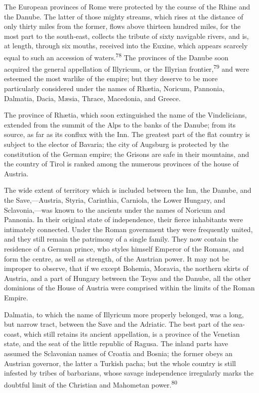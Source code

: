 The European provinces of Rome were protected by the course of
the Rhine and the Danube. The latter of those mighty streams,
which rises at the distance of only thirty miles from the former,
flows above thirteen hundred miles, for the most part to the
south-east, collects the tribute of sixty navigable rivers, and
is, at length, through six mouths, received into the Euxine,
which appears scarcely equal to such an accession of waters.\textsuperscript{78}
The provinces of the Danube soon acquired the general appellation
of Illyricum, or the Illyrian frontier,\textsuperscript{79} and were esteemed the
most warlike of the empire; but they deserve to be more
particularly considered under the names of Rhætia, Noricum,
Pannonia, Dalmatia, Dacia, Mæsia, Thrace, Macedonia, and Greece.



The province of Rhætia, which soon extinguished the name of the
Vindelicians, extended from the summit of the Alps to the banks
of the Danube; from its source, as far as its conflux with the
Inn. The greatest part of the flat country is subject to the
elector of Bavaria; the city of Augsburg is protected by the
constitution of the German empire; the Grisons are safe in their
mountains, and the country of Tirol is ranked among the numerous
provinces of the house of Austria.

The wide extent of territory which is included between the Inn,
the Danube, and the Save,—Austria, Styria, Carinthia, Carniola,
the Lower Hungary, and Sclavonia,—was known to the ancients under
the names of Noricum and Pannonia. In their original state of
independence, their fierce inhabitants were intimately connected.
Under the Roman government they were frequently united, and they
still remain the patrimony of a single family. They now contain
the residence of a German prince, who styles himself Emperor of
the Romans, and form the centre, as well as strength, of the
Austrian power. It may not be improper to observe, that if we
except Bohemia, Moravia, the northern skirts of Austria, and a
part of Hungary between the Teyss and the Danube, all the other
dominions of the House of Austria were comprised within the
limits of the Roman Empire.

Dalmatia, to which the name of Illyricum more properly belonged,
was a long, but narrow tract, between the Save and the Adriatic.
The best part of the sea-coast, which still retains its ancient
appellation, is a province of the Venetian state, and the seat of
the little republic of Ragusa. The inland parts have assumed the
Sclavonian names of Croatia and Bosnia; the former obeys an
Austrian governor, the latter a Turkish pacha; but the whole
country is still infested by tribes of barbarians, whose savage
independence irregularly marks the doubtful limit of the
Christian and Mahometan power.\textsuperscript{80}

